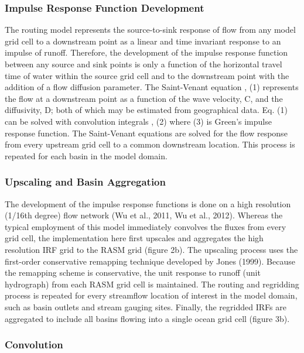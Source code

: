 \subsubsection{Impulse Response Function Development}

The routing model represents the source-to-sink response of flow from any model grid cell to a downstream point as a linear and time invariant response to an impulse of runoff.  Therefore, the development of the impulse response function between any source and sink points is only a function of the horizontal travel time of water within the source grid cell and to the downstream point with the addition of a flow diffusion parameter.  The Saint-Venant equation
,							(1)
represents the flow at a downstream point as a function of the wave velocity, C, and the diffusivity, D; both of which may be estimated from geographical data.  Eq. (1) can be solved with convolution integrals
,						(2)	
where
						(3)
is Green’s impulse response function.  The Saint-Venant equations are solved for the flow response from every upstream grid cell to a common downstream location.  This process is repeated for each basin in the model domain.

\subsubsection{Upscaling and Basin Aggregation}

The development of the impulse response functions is done on a high resolution (1/16th degree) flow network (Wu et al., 2011, Wu et al., 2012).  Whereas the typical employment of this model immediately convolves the fluxes from every grid cell, the implementation here first upscales and aggregates the high resolution IRF grid to the RASM grid (figure 2b). The upscaling process uses the first-order conservative remapping technique developed by Jones (1999). Because the remapping scheme is conservative, the unit response to runoff (unit hydrograph) from each RASM grid cell is maintained. The routing and regridding process is repeated for every streamflow location of interest in the model domain, such as basin outlets and stream gauging sites.  Finally, the regridded IRFs are aggregated to include all basins flowing into a single ocean grid cell (figure 3b).

\subsubsection{Convolution}


